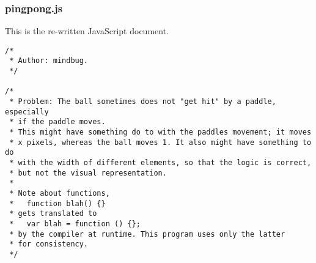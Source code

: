 \documentclass[a4paper,10pt]{article}
\begin{document}
\newpage
\subsubsection{pingpong.js}
This is the re-written JavaScript document.

\begin{verbatim}
/*
 * Author: mindbug.
 */

/*
 * Problem: The ball sometimes does not "get hit" by a paddle, especially 
 * if the paddle moves.
 * This might have something do to with the paddles movement; it moves
 * x pixels, whereas the ball moves 1. It also might have something to do
 * with the width of different elements, so that the logic is correct,
 * but not the visual representation.
 *
 * Note about functions,
 *   function blah() {}
 * gets translated to
 *   var blah = function () {};
 * by the compiler at runtime. This program uses only the latter
 * for consistency.
 */


\end{verbatim}
\end{document}
